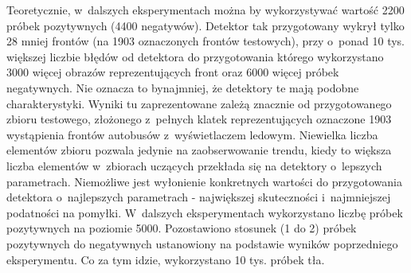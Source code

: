 Teoretycznie, w~dalszych
eksperymentach można by wykorzystywać wartość 2200 próbek pozytywnych (4400 negatywów).
Detektor tak przygotowany wykrył tylko 28 mniej frontów (na 1903 oznaczonych frontów 
testowych), przy o~ponad 10 tys. większej liczbie błędów od detektora do przygotowania
którego wykorzystano 3000 więcej obrazów reprezentujących front oraz 6000 więcej próbek negatywnych. Nie oznacza to bynajmniej, że detektory te mają podobne charakterystyki.
Wyniki tu zaprezentowane zależą znacznie od przygotowanego zbioru testowego, złożonego
z~pełnych klatek reprezentujących oznaczone 1903 wystąpienia frontów autobusów z~wyświetlaczem
ledowym. Niewielka liczba elementów zbioru pozwala jedynie na zaobserwowanie trendu, 
kiedy to większa liczba elementów w~zbiorach uczących przekłada się na detektory o~lepszych
parametrach. Niemożliwe jest wyłonienie konkretnych wartości do przygotowania detektora
o~najlepszych parametrach - największej skuteczności i~najmniejszej podatności na pomyłki.
W~dalszych eksperymentach wykorzystano liczbę próbek pozytywnych na poziomie 5000.
Pozostawiono stosunek (1 do 2) próbek pozytywnych do negatywnych ustanowiony na podstawie wyników poprzedniego eksperymentu. Co za tym idzie, wykorzystano 10 tys. próbek tła.

